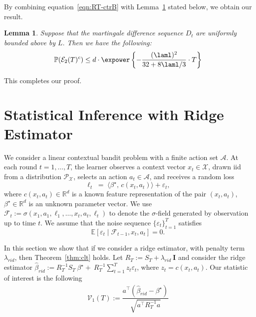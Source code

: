 \documentclass[11pt,letterpaper]{article}
\newcommand{\Prob}{\mathbb{P}}
\newcommand{\rpen}{\lambda_{rid}}
\newcommand{\BT}{{\Sigma^\star_T}}
\newcommand{\Id}{\mathbf{I}}
\newcommand{\z}{z}
\newcommand{\Etwo}{\mathcal{E}_2(T)}
\newcommand{\loss}{\ell}
\theoremstyle{plain}
\newtheorem{lemma}{Lemma}
\theoremstyle{definition}  %
\begin{document}
\noindent By combining equation~\eqref{eqn:RT-ctrB} with Lemma~\ref{lemma:lmin-ST} stated below, we obtain our result.

\begin{lemma}\label{lemma:lmin-ST}
Suppose that the martingale difference sequence $D_t$ are uniformly bounded above by $L$. Then we have the following:
\begin{align}
        \Prob(\Etwo^c) \leq  d \cdot \expower\left\{ - \frac{(\laml)^2}{32 +  8\laml/3} \cdot  T\right\}
    \end{align}
\end{lemma}

\noindent This completes our proof.




\newpage

\section{Statistical Inference with Ridge Estimator}\label{appnd:ridge}

\newcommand{\rao}{\mathcal{V}_1(T)}
\newcommand{\brid}{\hat{\beta}_{rid}}
\newcommand{\rbase}{\sqrt{a^\top R_T^{-1} a}}
\newcommand{\rbaseto}{\sqrt{a^\top [R_T^{-1} \BT ] \left( \frac{1}{T} \BT \right)^{-1}  a}}

\newcommand{\rmatto}{\mathcal{M}_2(T)}
\newcommand{\rratto}{\mathcal{V}_2(T)}

We consider a linear contextual bandit problem with a finite action set $\mathcal{A}$. 
At each round $t = 1, \ldots, T$, the learner observes a context vector $x_t \in \mathcal{X}$, drawn iid from a distribution $\mathcal{P_X}$, selects an action $a_t \in \mathcal{A}$, and receives a random loss
\begin{equation*}
\loss_t \;=\; \langle \beta^\star,\, c(x_t, a_t) \rangle + \varepsilon_t,
\end{equation*}
where $c(x_t, a_t) \in \mathbb{R}^d$ is a known feature representation of the pair $(x_t,a_t)$, 
$\beta^\star \in \mathbb{R}^d$ is an unknown parameter vector. We use $\mathcal{F}_t := \sigma(x_1, a_1, \loss_1, \ldots, x_{t}, a_t, \loss_t)$ to denote the $\sigma$-field generated by observation up to time $t$. We assume that the noise sequence $\{\varepsilon_t\}_{t=1}^T$ satisfies
\begin{equation*}
\mathbb{E}[\varepsilon_t \mid \mathcal{F}_{t-1}, x_t, a_t] = 0.
\end{equation*}

\noindent In this section we show that if we consider a ridge estimator, with penalty term $\rpen $, then Theorem~\ref{thm:clt} holds. Let $R_T := S_T + \rpen \ \Id$ and consider the ridge estimator 
$\brid:= R_T^{-1}S_T \ \beta^\star + \ R_T^{-1} \sum^T_{t=1} \z_t \varepsilon_t$, where $\z_t = c(x_t, a_t)$. Our statistic of interest is the following
\begin{align}\label{defn:rao}
   \rao := \dfrac{a^\top(\brid - \beta^\star)}{\rbase} 
\end{align}
\end{document}
